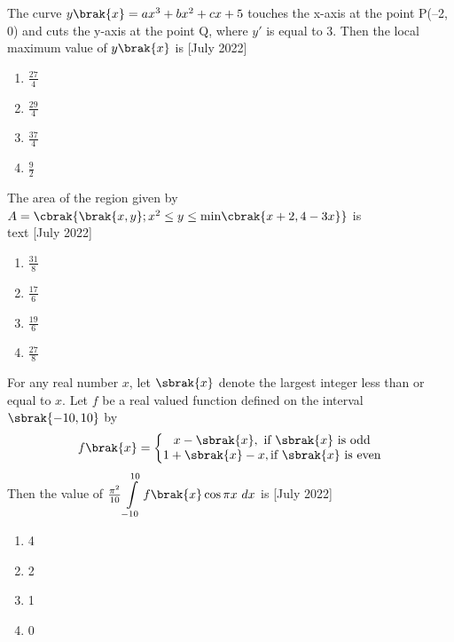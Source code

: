  	\item{
			The curve $y\brak{x} = ax^3 + bx^2 + cx + 5$ touches the x-axis at the point P(–2, 0) and cuts the y-axis at the point Q, where $y'$ is equal to 3. Then the local maximum value of $y\brak{x}$ is
			\text{ }
			\hfill
			{[July 2022]}
			
			\begin{multicols}{4}
				\begin{enumerate}
					\item $\frac{27}{4}$
					\item $\frac{29}{4}$
					\item $\frac{37}{4}$
					\item $\frac{9}{2}$
				\end{enumerate}
			\end{multicols}
			
		}
 	\item{
			The area of the region given by $A=\cbrak{\brak{x,y};x^2\leq y \leq \text{min}\cbrak{x+2, 4-3x}}$ is \\text{ } \hfill
			{[July 2022]}
			
			\begin{multicols}{2}
				\begin{enumerate}
					\item $\frac{31}{8}$
					\item $\frac{17}{6}$
					\item $\frac{19}{6}$
					\item $\frac{27}{8}$
				\end{enumerate}
			\end{multicols}
			
		}
    \item{
            For any real number $x$, let $\sbrak{x}$ denote the largest integer less than or equal to $x$. Let $f$ be a real valued function defined on the interval $\sbrak{-10, 10}$ by $$ f\brak{x}=\left\{\begin{matrix}x-\sbrak{x}, \text{ if } \sbrak{x} \text{ is odd} \\1+\sbrak{x}-x, \text{if }\sbrak{x}\text{ is even}\end{matrix}\right.$$ Then the value of $\frac{\pi^2}{10}\displaystyle\int\limits_{-10}^{10}f\brak{x}\cos\pi x\ dx$ is
             \text{ }
             \hfill
                {[July 2022]}
            \begin{multicols}{4}
                \begin{enumerate}
                	\item 4
                    \item 2
                    \item 1
                    \item 0
                \end{enumerate}
            \end{multicols}

        
        }

